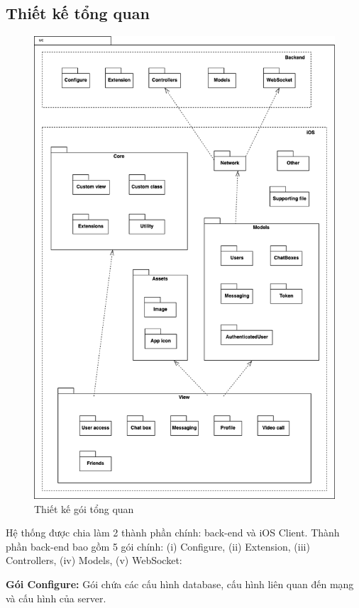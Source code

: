 \documentclass[../DoAn.tex]{subfiles}
\begin{document}
\newpage
\subsection{Thiết kế tổng quan} 
\begin{figure}[H]
    \centering
    \includegraphics[width=1\linewidth]{Hinhve/Package/Package.png}
    \caption{Thiết kế gói tổng quan}
    \label{fig:use_case_tổng_quan}
\end{figure}
Hệ thống được chia làm 2 thành phần chính: back-end và iOS Client.
Thành phần back-end bao gồm 5 gói chính: (i) Configure, (ii) Extension, (iii) Controllers, (iv) Models, (v) WebSocket: 

\textbf{Gói Configure:} Gói chứa các cấu hình database, cấu hình liên quan đến mạng và cấu hình của server.
\end{document}
